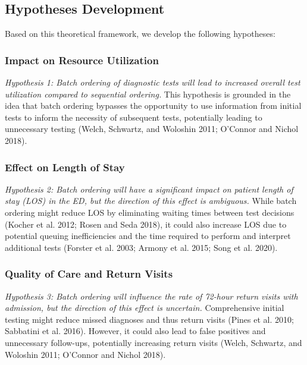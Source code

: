 \documentclass{article}
\begin{document}
\hypertarget{hypotheses-development}{%
\subsection{Hypotheses Development}\label{hypotheses-development}}

Based on this theoretical framework, we develop the following
hypotheses:

\hypertarget{impact-on-resource-utilization}{%
\subsubsection{Impact on Resource
Utilization}\label{impact-on-resource-utilization}}

\emph{Hypothesis 1: Batch ordering of diagnostic tests will lead to
increased overall test utilization compared to sequential ordering.}
This hypothesis is grounded in the idea that batch ordering bypasses the
opportunity to use information from initial tests to inform the
necessity of subsequent tests, potentially leading to unnecessary
testing (Welch, Schwartz, and Woloshin 2011; O'Connor and Nichol 2018).

\hypertarget{effect-on-length-of-stay}{%
\subsubsection{Effect on Length of
Stay}\label{effect-on-length-of-stay}}

\emph{Hypothesis 2: Batch ordering will have a significant impact on
patient length of stay (LOS) in the ED, but the direction of this effect
is ambiguous.} While batch ordering might reduce LOS by eliminating
waiting times between test decisions (Kocher et al. 2012; Rosen and Seda
2018), it could also increase LOS due to potential queuing
inefficiencies and the time required to perform and interpret additional
tests (Forster et al. 2003; Armony et al. 2015; Song et al. 2020).

\hypertarget{quality-of-care-and-return-visits}{%
\subsubsection{Quality of Care and Return
Visits}\label{quality-of-care-and-return-visits}}

\emph{Hypothesis 3: Batch ordering will influence the rate of 72-hour
return visits with admission, but the direction of this effect is
uncertain.} Comprehensive initial testing might reduce missed diagnoses
and thus return visits (Pines et al. 2010; Sabbatini et al. 2016).
However, it could also lead to false positives and unnecessary
follow-ups, potentially increasing return visits (Welch, Schwartz, and
Woloshin 2011; O'Connor and Nichol 2018).
\end{document}
